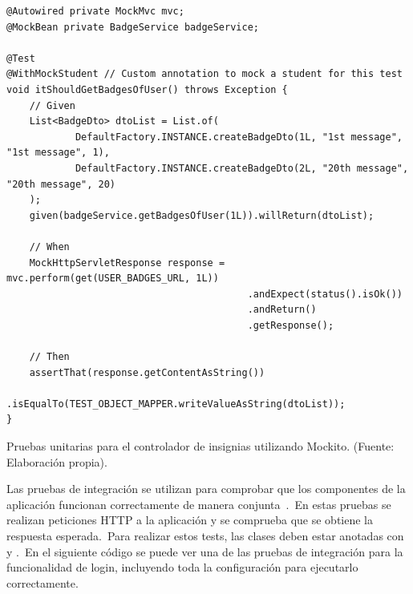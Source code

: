 \begin{itemize}
	\begin{codeBlock}
		\begin{verbatim}
@Autowired private MockMvc mvc;
@MockBean private BadgeService badgeService;

@Test
@WithMockStudent // Custom annotation to mock a student for this test
void itShouldGetBadgesOfUser() throws Exception {
	// Given
	List<BadgeDto> dtoList = List.of(
			DefaultFactory.INSTANCE.createBadgeDto(1L, "1st message", "1st message", 1),
			DefaultFactory.INSTANCE.createBadgeDto(2L, "20th message", "20th message", 20)
	);
	given(badgeService.getBadgesOfUser(1L)).willReturn(dtoList);

	// When
	MockHttpServletResponse response = mvc.perform(get(USER_BADGES_URL, 1L))
	                                      .andExpect(status().isOk())
	                                      .andReturn()
	                                      .getResponse();

	// Then
	assertThat(response.getContentAsString())
			.isEqualTo(TEST_OBJECT_MAPPER.writeValueAsString(dtoList));
}
		\end{verbatim}
		\caption{Pruebas unitarias para el controlador de insignias utilizando Mockito. (Fuente: Elaboración propia).}
		\label{code:pruebas-unitarias-controlador}
	\end{codeBlock}

\end{itemize}
\label{itm:pruebas-unitarias-backend}


Las pruebas de integración se utilizan para comprobar que los componentes de la aplicación funcionan correctamente
de manera conjunta~\cite{integration_testing}.\ En estas pruebas se realizan peticiones HTTP a la aplicación y se
comprueba que se obtiene la respuesta esperada.\ Para realizar estos tests, las clases deben estar
anotadas con  y .\ En el siguiente código se puede ver
una de las pruebas de integración para la funcionalidad de login, incluyendo toda la configuración para ejecutarlo
correctamente.

